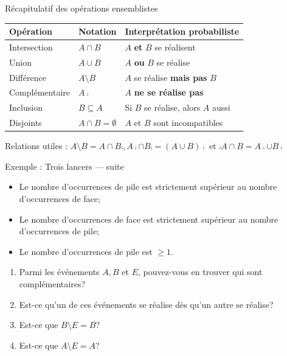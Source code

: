 \documentclass[nuit,charter,pied,handout]{BeamerJS}
\begin{document}
\begin{frame}[t]{Récapitulatif des opérations ensemblistes}
\pause
\begin{center}
{\small
\begin{tabular}{|l|l|l|}
\hline
\textbf{Opération} & \textbf{Notation} & \textbf{Interprétation probabiliste} \\ \hline
Intersection & \(A\cap B\) & \(A\) \textbf{et} \(B\) se réalisent \\ \hline
Union & \(A\cup B\) & \(A\) \textbf{ou} \(B\) se réalise \\ \hline
Différence & \(A\setminus B\) & \(A\) se réalise \textbf{mais pas} \(B\) \\ \hline
Complémentaire & \(A\comp\) & \(A\) \textbf{ne se réalise pas} \\ \hline
Inclusion & \(B\subseteq A\) & Si \(B\) se réalise, alors \(A\) aussi \\ \hline
Disjoints & \(A\cap B=\emptyset\) & \(A\) et \(B\) sont incompatibles \\ \hline
\end{tabular}
}
\end{center}
\pause
\vfill
\begin{lumiere}
Relations utiles : \(A\setminus B = A\cap B\comp, A\comp\cap B\comp = (A\cup B)\comp\) et \(\comp{A\cap B}=A\comp\cup B\comp\)
\end{lumiere}
\end{frame}

\begin{frame}{Exemple : Trois lancers --- suite}
	\vspace{-0.5cm}
\begin{itemize}
	\item[\color{black}\(A=\)] Le nombre d'occurrences de pile est strictement supérieur au nombre d'occurrences de face; 
	\item[\color{black}\(B=\)] Le nombre d'occurrences de face est strictement supérieur au nombre d'occurrences de pile; 
	\item[\color{black}\(E=\)] Le nombre d'occurrences de pile est \(\geq 1\).\pause
\end{itemize}
\begin{cadre}
\begin{enumerate}
	\item Parmi les événements \(A, B\) et \(E\), pouvez-vous en trouver qui sont complémentaires? 
	\item Est-ce qu'un de ces événements se réalise dès qu'un autre se réalise? 
	\item Est-ce que \(B\setminus E = B\)?
	\item Est-ce que \(A\setminus E = A\)?
\end{enumerate}
\end{cadre}
\end{frame}
\end{document}
